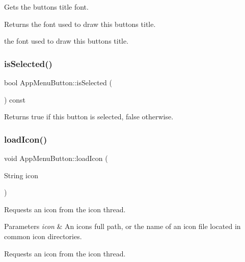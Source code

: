 Gets the button\textquotesingle{}s title font.

\begin{DoxyReturn}{Returns}
the font used to draw this button\textquotesingle{}s title.

the font used to draw this button\textquotesingle{}s title. 
\end{DoxyReturn}
\mbox{\label{classAppMenuButton_aae298a5007ccac5f71c89375d1954d74}} 
\subsubsection{\texorpdfstring{is\+Selected()}{isSelected()}}
{\footnotesize\ttfamily bool App\+Menu\+Button\+::is\+Selected (\begin{DoxyParamCaption}{ }\end{DoxyParamCaption}) const}

\begin{DoxyReturn}{Returns}
true if this button is selected, false otherwise. 
\end{DoxyReturn}
\mbox{\label{classAppMenuButton_a8c3a08391a811b18631ce391f51bd081}} 
\subsubsection{\texorpdfstring{load\+Icon()}{loadIcon()}}
{\footnotesize\ttfamily void App\+Menu\+Button\+::load\+Icon (\begin{DoxyParamCaption}\item[{String}]{icon }\end{DoxyParamCaption})\hspace{0.3cm}{\ttfamily [protected]}}

Requests an icon from the icon thread.


\begin{DoxyParams}{Parameters}
{\em icon} & An icon\textquotesingle{}s full path, or the name of an icon file located in common icon directories.\\
\hline
\end{DoxyParams}
Requests an icon from the icon thread. \mbox{\label{classAppMenuButton_a9e7e01517bf52a0e1519206e6c76db7a}} 
